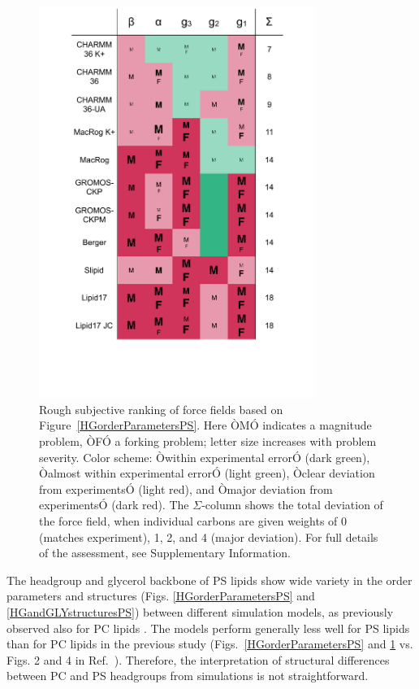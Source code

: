 \documentclass[aps,prl,superscriptaddress,twocolumn]{revtex4}
\begin{document}
\begin{figure}[]
  \centering
  \includegraphics[width=9.0cm]{../Figs/comparisonTablePS.pdf}
  \caption{\label{comparisonTablePS}
    Rough subjective ranking of force fields based on Figure~\ref{HGorderParametersPS}.
    Here ÒMÓ indicates a magnitude problem, ÒFÓ a forking problem; letter size increases with problem severity. Color scheme: Òwithin experimental errorÓ (dark green), Òalmost within experimental errorÓ (light green), Òclear deviation from experimentsÓ (light red), and Òmajor deviation from experimentsÓ (dark red). The $\Sigma$-column shows the total deviation of the force field, when individual carbons are given weights of 0 (matches experiment), 1, 2, and 4 (major deviation). For full details of the assessment, see Supplementary Information.
  }
\end{figure}

The headgroup and glycerol backbone of PS lipids show wide variety
in the order parameters and structures (Figs. \ref{HGorderParametersPS} and \ref{HGandGLYstructuresPS})
between different simulation models,
as previously observed also for PC lipids \cite{botan15}.
The models perform generally less well for PS lipids than for PC lipids in the previous study
(Figs.~\ref{HGorderParametersPS} and \ref{comparisonTablePS} vs. Figs. 2 and 4 in Ref.~\cite{botan15}).
Therefore, the interpretation of structural differences between PC and PS headgroups
from simulations is not straightforward.
\end{document}
